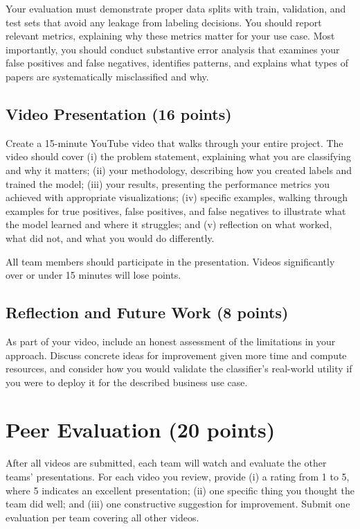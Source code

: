 \documentclass[11pt]{article}
\begin{document}
Your evaluation must demonstrate proper data splits with train, validation, and test sets that avoid any leakage from labeling decisions. You should report relevant metrics, explaining why these metrics matter for your use case. Most importantly, you should conduct substantive error analysis that examines your false positives and false negatives, identifies patterns, and explains what types of papers are systematically misclassified and why.

\subsection*{Video Presentation (16 points)}

Create a 15-minute YouTube video that walks through your entire project. The video should cover (i) the problem statement, explaining what you are classifying and why it matters; (ii) your methodology, describing how you created labels and trained the model; (iii) your results, presenting the performance metrics you achieved with appropriate visualizations; (iv) specific examples, walking through examples for true positives, false positives, and false negatives to illustrate what the model learned and where it struggles; and (v) reflection on what worked, what did not, and what you would do differently.

All team members should participate in the presentation. Videos significantly over or under 15 minutes will lose points.

\subsection*{Reflection and Future Work (8 points)}

As part of your video, include an honest assessment of the limitations in your approach. Discuss concrete ideas for improvement given more time and compute resources, and consider how you would validate the classifier's real-world utility if you were to deploy it for the described business use case.

\section*{Peer Evaluation (20 points)}

After all videos are submitted, each team will watch and evaluate the other teams' presentations. For each video you review, provide (i) a rating from 1 to 5, where 5 indicates an excellent presentation; (ii) one specific thing you thought the team did well; and (iii) one constructive suggestion for improvement. Submit one evaluation per team covering all other videos.
\end{document}
